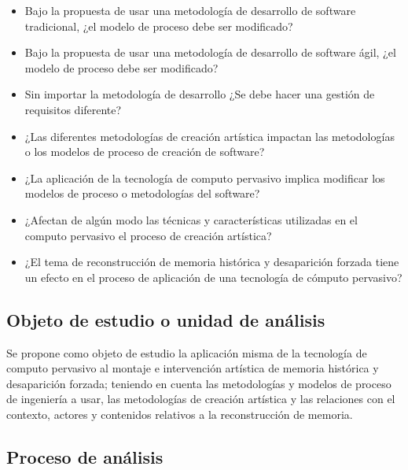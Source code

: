 \begin{itemize}
    \item Bajo la propuesta de usar una metodología de desarrollo de software tradicional, ¿el modelo de proceso debe ser modificado?
    \item Bajo la propuesta de usar una metodología de desarrollo de software ágil, ¿el modelo de proceso debe ser modificado?
    \item Sin importar la metodología de desarrollo ¿Se debe hacer una gestión de requisitos diferente?
    \item ¿Las diferentes metodologías de creación artística impactan las metodologías o los modelos de proceso de creación de software?
    \item ¿La aplicación de la tecnología de computo pervasivo implica modificar los modelos de proceso o metodologías del software?
    \item ¿Afectan de algún modo las técnicas y características utilizadas en el computo pervasivo el proceso de creación artística?
    \item ¿El tema de reconstrucción de memoria histórica y desaparición forzada tiene un efecto en el proceso de aplicación de una tecnología de cómputo pervasivo?
\end{itemize}

\subsection{Objeto de estudio o unidad de análisis}

Se propone como objeto de estudio la aplicación misma de la tecnología de computo pervasivo al montaje e intervención artística de memoria histórica y desaparición forzada; teniendo en cuenta las metodologías y modelos de proceso de ingeniería a usar, las metodologías de creación artística y las relaciones con el contexto, actores y contenidos relativos a la reconstrucción de memoria.

\subsection{Proceso de análisis}

